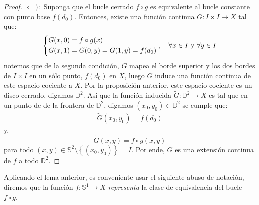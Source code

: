 \documentclass{article}
\newcounter{it}
\theoremstyle{largebreak}
\newcommand\cf[3]{\ensuremath{#1:#2\rightarrow#3}}
\begin{document}
\begin{proof}
        $\Leftarrow):$ Suponga que el bucle cerrado $f\circ g$ es equivalente al bucle constante con punto base $f(d_0)$. Entonces, existe una función continua $\cf{G}{I\times I}{X}$ tal que:
        \begin{equation*}
            \left\{
                \begin{split}
                    G(x,0) & = f\circ g(x)\\
                    G(x,1) & = G(0,y) = G(1,y) = f(d_0)\\
                \end{split}
            \right.,\quad\forall x\in I\textup{ y }\forall y\in I
        \end{equation*}
        notemos que de la segunda condición, $G$ mapea el borde superior y los dos bordes de $I\times I$ en un sólo punto, $f(d_0)$ en $X$, luego $G$ induce una función continua de este espacio cociente a $X$. Por la proposición anterior, este espacio cociente es un disco cerrado, digamos $\mathbb{D}^2$. Así que la función inducida $\cf{\widetilde{G}}{\mathbb{D}^2}{X}$ es tal que en un punto de de la frontera de $\mathbb{D}^2$, digamos $(x_0,y_0)\in\mathbb{D}^2$ se cumple que:
        \begin{equation*}
            \begin{split}
                \widetilde{G}(x_0,y_0)=f(d_0)
            \end{split}
        \end{equation*}
        y,
        \begin{equation*}
            \widetilde{G}(x,y)=f\circ g(x,y)
        \end{equation*}
        para todo $(x,y)\in\mathbb{S}^2\setminus\left\{(x_0,y_0)\right\}=I$. Por ende, $G$ es una extensión continua de $f$ a todo $\mathbb{D}^2$. 
    \end{proof}

    Aplicando el lema anterior, es conveniente usar el siguiente abuso de notación, diremos que la función $\cf{f}{\mathbb{S}^1}{X}$ \textit{representa} la clase de equivalencia del bucle $f\circ g$.
\end{document}
